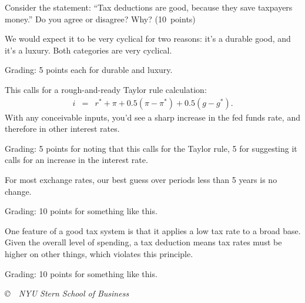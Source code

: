 \documentclass[letterpaper,12pt]{exam}
\begin{document}
\begin{questions}
\begin{parts}
\item Consider the statement:  ``Tax deductions are good, because they save taxpayers money.''
Do you agree or disagree?  Why?
(10~points)
\end{parts}

\begin{solution}
\begin{parts}
\item We would expect it to be very cyclical for two reasons:
it's a durable good, and it's a luxury.
Both categories are very cyclical.

Grading:  5 points each for durable and luxury.

\item This calls for a rough-and-ready Taylor rule calculation:
\begin{eqnarray*}
    i &=& r^* + \pi + 0.5 (\pi - \pi^*) + 0.5 (g - g^*) .
\end{eqnarray*}
With any conceivable inputs, you'd see a sharp increase in the fed funds rate,
and therefore in other interest rates.

Grading:  5 points for noting that this calls for the Taylor rule,
5 for suggesting it calls for an increase in the interest rate.

\item For most exchange rates, our best guess over periods less than 5 years is no change.

Grading:  10 points for something like this.

\item One feature of a good tax system is that it applies a low tax rate to a broad
base.
Given the overall level of spending, a tax deduction means tax rates must be higher
on other things, which violates this principle.

Grading:  10 points for something like this.
\end{parts}
\end{solution}

\end{questions}


\vfill \centerline{\it \copyright \ \number\year \ NYU Stern
School of Business}
\end{document}
